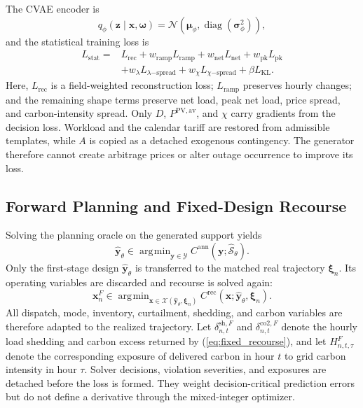 \documentclass[times]{elsarticle}
\DeclareMathOperator*{\argmin}{\arg\!\min}
\begin{document}
The CVAE encoder is
\begin{equation}
q_\phi(\bm z\mid\bm x,\bm\omega)=
\mathcal N(\bm\mu_\phi,\operatorname{diag}(\bm\sigma_\phi^2)),
\label{eq:cvae}
\end{equation}
and the statistical training loss is
\begin{align}
L_{\mathrm{stat}}={}&L_{\mathrm{rec}}+w_{\mathrm{ramp}}L_{\mathrm{ramp}}
+w_{\mathrm{net}}L_{\mathrm{net}}+w_{\mathrm{pk}}L_{\mathrm{pk}}
\nonumber\\
&+w_{\lambda}L_{\lambda\mathrm{-spread}}
+w_{\chi}L_{\chi\mathrm{-spread}}
+\beta L_{\mathrm{KL}}.
\label{eq:cvae_loss}
\end{align}
Here, $L_{\mathrm{rec}}$ is a field-weighted reconstruction loss;
$L_{\mathrm{ramp}}$ preserves hourly changes; and the remaining shape terms
preserve net load, peak net load, price spread, and carbon-intensity spread.
Only $D$, $P^{\mathrm{PV,av}}$, and $\chi$ carry gradients from the decision loss.
Workload and the calendar tariff are restored from admissible templates, while
$A$ is copied as a detached exogenous contingency. The generator therefore
cannot create arbitrage prices or alter outage occurrence to improve its loss.

\subsection{Forward Planning and Fixed-Design Recourse}

Solving the planning oracle on the generated support yields
\begin{equation}
\widehat{\bm y}_\theta\in
\argmin_{\bm y\in\mathcal Y}
C^{\mathrm{ann}}(\bm y;\widehat{\mathcal S}_\theta).
\label{eq:forward_plan}
\end{equation}
Only the first-stage design $\widehat{\bm y}_\theta$ is transferred to the
matched real trajectory $\bm\xi_n$. Its operating variables are discarded and
recourse is solved again:
\begin{equation}
\bm x_n^{F}\in\argmin_{\bm x\in
\mathcal X(\widehat{\bm y}_\theta,\bm\xi_n)}
C^{\mathrm{rec}}(\bm x;\widehat{\bm y}_\theta,\bm\xi_n).
\label{eq:fixed_recourse}
\end{equation}
All dispatch, mode, inventory, curtailment, shedding, and carbon variables are
therefore adapted to the realized trajectory. Let
$\delta^{\mathrm{sh},F}_{n,t}$ and $\delta^{\mathrm{co2},F}_{n,t}$ denote the hourly load
shedding and carbon excess returned by (\ref{eq:fixed_recourse}), and let
$H^F_{n,t,\tau}$ denote the corresponding exposure of delivered carbon in hour
$t$ to grid carbon intensity in hour $\tau$. Solver decisions, violation
severities, and exposures are detached before the loss is formed. They weight
decision-critical prediction errors but do not define a derivative through the
mixed-integer optimizer.
\end{document}
